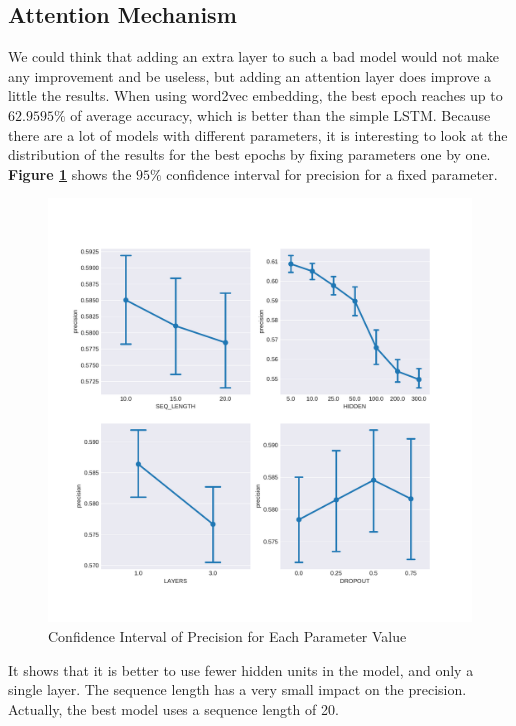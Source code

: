 \subsection{Attention Mechanism}
We could think that adding an extra layer to such a bad model would not make any improvement and be useless, but adding an attention layer does improve a little the results. When using word2vec embedding, the best epoch reaches up to $62.9595\%$ of average accuracy, which is better than the simple LSTM. Because there are a lot of models with different parameters, it is interesting to look at the distribution of the results for the best epochs by fixing parameters one by one. \textbf{Figure \ref{fig:chap4:att1:confInt}} shows the $95\%$ confidence interval for precision for a fixed parameter. \\
\begin{figure}
 \centering
 \includegraphics[width=\textwidth]{images/chapitre4/confInt_precision_liar_attention_word2vec}
 \caption{Confidence Interval of Precision for Each Parameter Value}
 \label{fig:chap4:att1:confInt}
\end{figure}
It shows that it is better to use fewer hidden units in the model, and only a single layer. The sequence length has a very small impact on the precision. Actually, the best model uses a sequence length of 20. \\\
